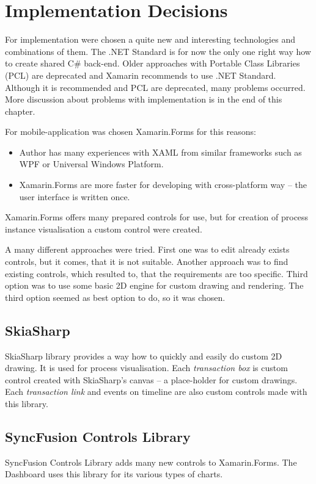 \section{Implementation Decisions}
For implementation were chosen a quite new and interesting technologies and combinations of them.
The .NET Standard is for now the only one right way how to create shared C\# back-end. Older approaches with Portable Class Libraries (PCL) are deprecated and Xamarin recommends to use .NET Standard. Although it is recommended and PCL are deprecated, many problems occurred. More discussion about problems with implementation is in the end of this chapter.

For mobile-application was chosen Xamarin.Forms for this reasons:
\begin{itemize}
\item Author has many experiences with XAML from similar frameworks such as WPF or Universal Windows Platform.
\item Xamarin.Forms are more faster for developing with cross-platform way -- the user interface is written once.
\end{itemize}

Xamarin.Forms offers many prepared controls for use, but for creation of process instance visualisation a custom control were created.  

A many different approaches were tried. First one was to edit already exists controls, but it comes, that it is not suitable. Another approach was to find existing controls, which resulted to, that the requirements are too specific. Third option was to use some basic 2D engine for custom drawing and rendering. The third option seemed as best option to do, so it was chosen. 
\subsection{SkiaSharp}
SkiaSharp library \cite{skiasharp} provides a way how to quickly and easily do custom 2D drawing. It is used for process visualisation. Each \textit{transaction box} is custom control created with SkiaSharp's canvas -- a place-holder for custom drawings. Each \textit{transaction link} and events on timeline are also custom controls made with this library. 
\subsection{SyncFusion Controls Library}
SyncFusion Controls Library  adds many new controls to Xamarin.Forms. The Dashboard uses this library for its various types of charts. 
